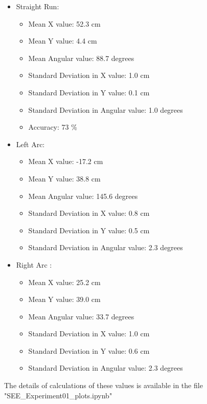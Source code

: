 \documentclass[10pt,a4paper]{article}
\begin{document}
	\begin{itemize}
		\item Straight Run:		
			\begin{itemize}
				\item Mean X value: 52.3 cm
				\item Mean Y value: 4.4 cm
				\item Mean Angular value: 88.7 degrees
				\item Standard Deviation in X value: 1.0 cm
				\item Standard Deviation in Y value: 0.1 cm
				\item Standard Deviation in Angular value: 1.0 degrees
				\item Accuracy: 73 \%
			\end{itemize}
		\item Left Arc:
			\begin{itemize}
				\item Mean X value: -17.2 cm
				\item Mean Y value: 38.8 cm
				\item Mean Angular value: 145.6 degrees
				\item Standard Deviation in X value: 0.8 cm
				\item Standard Deviation in Y value: 0.5 cm
				\item Standard Deviation in Angular value: 2.3 degrees
			\end{itemize}
		\item Right Arc	:
			\begin{itemize}
				\item Mean X value: 25.2 cm
				\item Mean Y value: 39.0 cm
				\item Mean Angular value: 33.7 degrees
				\item Standard Deviation in X value: 1.0 cm
				\item Standard Deviation in Y value: 0.6 cm
				\item Standard Deviation in Angular value: 2.3 degrees
			\end{itemize}	
	\end{itemize}
	The details of calculations of these values is available in the file "SEE\_Experiment01\_plots.ipynb"

	
	
	
\end{document}
